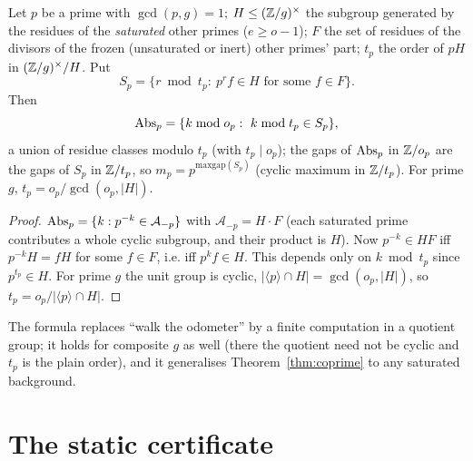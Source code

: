 \begin{theorem}\label{thm:quotient}
Let \(p\) be a prime with \(\gcd(p,g)=1\); \(H\le(\mathbb{Z}/g)^\times\) the subgroup generated by the residues of the \emph{saturated} other primes (\(e\ge o-1\)); \(F\) the set of residues of the divisors of the frozen (unsaturated or inert) other primes' part; \(t_p\) the order of \(pH\) in \((\mathbb{Z}/g)^\times/H\). Put
\[
S_p=\{r\bmod t_p:\ p^rf\in H\text{ for some }f\in F\}.
\]
Then
\[
\operatorname{Abs}_p=\{k\bmod o_p:\ k\bmod t_p\in S_p\},
\]
a union of residue classes modulo \(t_p\) (with \(t_p\mid o_p\)); the gaps of \(\operatorname{Abs}_p\) in \(\mathbb{Z}/o_p\) are the gaps of \(S_p\) in \(\mathbb{Z}/t_p\), so \(m_p=p^{\mathrm{maxgap}(S_p)}\) (cyclic maximum in \(\mathbb{Z}/t_p\)). For prime \(g\), \(t_p=o_p/\gcd(o_p,|H|)\).
\end{theorem}
\begin{proof}
\(\operatorname{Abs}_p=\{k:p^{-k}\in\mathcal A_{-p}\}\) with \(\mathcal A_{-p}=H\cdot F\) (each saturated prime contributes a whole cyclic subgroup, and their product is \(H\)). Now \(p^{-k}\in HF\) iff \(p^{-k}H=fH\) for some \(f\in F\), i.e. iff \(p^kf\in H\). This depends only on \(k\bmod t_p\) since \(p^{t_p}\in H\). For prime \(g\) the unit group is cyclic, \(|\langle p\rangle\cap H|=\gcd(o_p,|H|)\), so \(t_p=o_p/|\langle p\rangle\cap H|\).
\end{proof}

The formula replaces ``walk the odometer'' by a finite computation in a quotient group; it holds for composite \(g\) as well (there the quotient need not be cyclic and \(t_p\) is the plain order), and it generalises Theorem~\ref{thm:coprime} to any saturated background.

\section{The static certificate}

